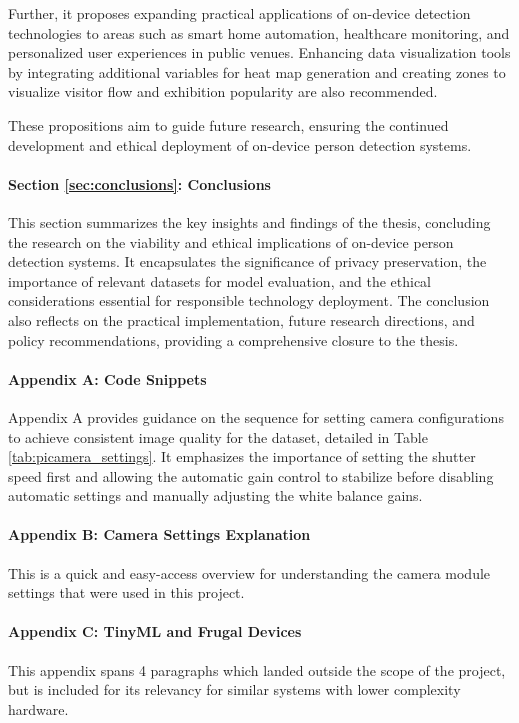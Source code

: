 Further, it proposes expanding practical applications of on-device detection technologies to areas such as smart home automation, healthcare monitoring, and personalized user experiences in public venues. Enhancing data visualization tools by integrating additional variables for heat map generation and creating zones to visualize visitor flow and exhibition popularity are also recommended.

These propositions aim to guide future research, ensuring the continued development and ethical deployment of on-device person detection systems.

\paragraph{Section \ref{sec:conclusions}: Conclusions} 
This section summarizes the key insights and findings of the thesis, concluding the research on the viability and ethical implications of on-device person detection systems. It encapsulates the significance of privacy preservation, the importance of relevant datasets for model evaluation, and the ethical considerations essential for responsible technology deployment. The conclusion also reflects on the practical implementation, future research directions, and policy recommendations, providing a comprehensive closure to the thesis.

\paragraph{Appendix A: Code Snippets} Appendix A provides guidance on the sequence for setting camera configurations to achieve consistent image quality for the dataset, detailed in Table \ref{tab:picamera_settings}. It emphasizes the importance of setting the shutter speed first and allowing the automatic gain control to stabilize before disabling automatic settings and manually adjusting the white balance gains.

\paragraph{Appendix B: Camera Settings Explanation} This is a quick and easy-access overview for understanding the camera module settings that were used in this project. 

\paragraph{Appendix C: TinyML and Frugal Devices} This appendix spans 4 paragraphs which landed outside the scope of the project, but is included for its relevancy for similar systems with lower complexity hardware. 

